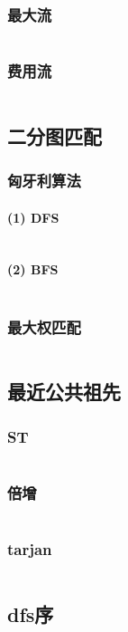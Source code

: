 \documentclass[a4paper,6pt]{article}
\begin{document}
\subsubsection{最大流}
\inputminted[breaklines]{c++}{graph-theory/network-flows/dinic.cpp}
\subsubsection{费用流}
\inputminted[breaklines]{c++}{graph-theory/network-flows/minCostMaxflow.cpp}
\subsection{二分图匹配}
\subsubsection{匈牙利算法}
\paragraph{(1) DFS}
\inputminted[breaklines]{c++}{graph-theory/bipartite-graph/hungary-dfs.cpp}
\paragraph{(2) BFS}
\inputminted[breaklines]{c++}{graph-theory/bipartite-graph/hungary-bfs.cpp}
\subsubsection{最大权匹配}
\inputminted[breaklines]{c++}{graph-theory/bipartite-graph/KM.cpp}
\subsection{最近公共祖先}
\subsubsection{ST}
\inputminted[breaklines]{c++}{graph-theory/LCA/ST.cpp}
\subsubsection{倍增}
\inputminted[breaklines]{c++}{graph-theory/LCA/doubly.cpp}
\subsubsection{tarjan}
\inputminted[breaklines]{c++}{graph-theory/LCA/tarjan.cpp}
\subsection{dfs序}
\inputminted[breaklines]{c++}{graph-theory/dfsx.cpp}
\end{document}

